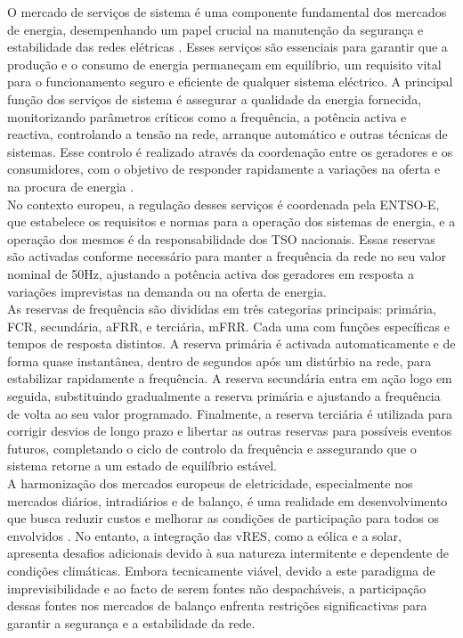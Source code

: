 O mercado de serviços de sistema é uma componente fundamental dos mercados de energia, desempenhando um papel crucial na manutenção da segurança e estabilidade das redes elétricas \cite{dgegmss}. Esses serviços são essenciais para garantir que a produção e o consumo de energia permaneçam em equilíbrio, um requisito vital para o funcionamento seguro e eficiente de qualquer sistema eléctrico. A principal função dos serviços de sistema é assegurar a qualidade da energia fornecida, monitorizando parâmetros críticos como a frequência, a potência activa e reactiva, controlando a tensão na rede, arranque automático e outras técnicas de sistemas. Esse controlo é realizado através da coordenação entre os geradores e os consumidores, com o objetivo de responder rapidamente a variações na oferta e na procura de energia \cite{Rassid2017} \cite{Carneiro2016}.\\
No contexto europeu, a regulação desses serviços é coordenada pela \gls{ENTSO-E}, que estabelece os requisitos e normas para a operação dos sistemas de energia, e a operação dos mesmos é da responsabilidade dos \gls{TSO} nacionais. Essas reservas são activadas conforme necessário para manter a frequência da rede no seu valor nominal de 50Hz, ajustando a potência activa dos geradores em resposta a variações imprevistas na demanda ou na oferta de energia.\\
As reservas de frequência são divididas em três categorias principais: primária, \gls{FCR}, secundária, \gls{aFRR}, e terciária, \gls{mFRR}. Cada uma com funções específicas e tempos de resposta distintos. A reserva primária é activada automaticamente e de forma quase instantânea, dentro de segundos após um distúrbio na rede, para estabilizar rapidamente a frequência. A reserva secundária entra em ação logo em seguida, substituindo gradualmente a reserva primária e ajustando a frequência de volta ao seu valor programado. Finalmente, a reserva terciária é utilizada para corrigir desvios de longo prazo e libertar as outras reservas para possíveis eventos futuros, completando o ciclo de controlo da frequência e assegurando que o sistema retorne a um estado de equilíbrio estável.\\
A harmonização dos mercados europeus de eletricidade, especialmente nos mercados diários, intradiários e de balanço, é uma realidade em desenvolvimento que busca reduzir custos e melhorar as condições de participação para todos os envolvidos \cite{Algarvio2019}. No entanto, a integração das \gls{vRES}, como a eólica e a solar, apresenta desafios adicionais devido à sua natureza intermitente e dependente de condições climáticas. Embora tecnicamente viável, devido a este paradigma de imprevisibilidade e ao facto de serem fontes não despacháveis, a participação dessas fontes nos mercados de balanço enfrenta restrições significactivas para garantir a segurança e a estabilidade da rede.\\
